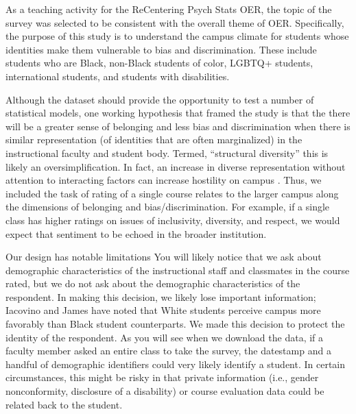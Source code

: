 \documentclass[
  english,
]{book}
\begin{document}
As a teaching activity for the ReCentering Psych Stats OER, the topic of the survey was selected to be consistent with the overall theme of OER. Specifically, the purpose of this study is to understand the campus climate for students whose identities make them vulnerable to bias and discrimination. These include students who are Black, non-Black students of color, LGBTQ+ students, international students, and students with disabilities.

Although the dataset should provide the opportunity to test a number of statistical models, one working hypothesis that framed the study is that the there will be a greater sense of belonging and less bias and discrimination when there is similar representation (of identities that are often marginalized) in the instructional faculty and student body. Termed, ``structural diversity'' \citep{lewis_black_2019} this is likely an oversimplification. In fact, an increase in diverse representation without attention to interacting factors can increase hostility on campus \citep{hurtado_linking_2007}. Thus, we included the task of rating of a single course relates to the larger campus along the dimensions of belonging and bias/discrimination. For example, if a single class has higher ratings on issues of inclusivity, diversity, and respect, we would expect that sentiment to be echoed in the broader institution.

Our design has notable limitations You will likely notice that we ask about demographic characteristics of the instructional staff and classmates in the course rated, but we do not ask about the demographic characteristics of the respondent. In making this decision, we likely lose important information; Iacovino and James \citeyearpar{iacovino_retaining_2016} have noted that White students perceive campus more favorably than Black student counterparts. We made this decision to protect the identity of the respondent. As you will see when we download the data, if a faculty member asked an entire class to take the survey, the datestamp and a handful of demographic identifiers could very likely identify a student. In certain circumstances, this might be risky in that private information (i.e., gender nonconformity, disclosure of a disability) or course evaluation data could be related back to the student.
\end{document}
